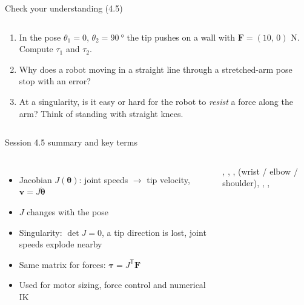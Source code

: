 \documentclass[aspectratio=169,10pt]{beamer}
\newcommand{\arm}[3]{%
  \draw[#3] (0,0) -- ++(#1:2.4) coordinate (E) -- ++(#1+#2:1.8) coordinate (T);
  \node[jnt] at (0,0) {}; \node[jnt] at (E) {}; \fill[mkOrange] (T) circle (1.6pt);}
\newcommand{\base}{\fill[pattern=north east lines,pattern color=mkGray] (-.35,-.25) rectangle (.35,-.08);
  \draw[mkGray,line width=.8pt] (-.35,-.08) -- (.35,-.08);}
\begin{document}
\begin{frame}[t]{Check your understanding (4.5)}
\begin{columns}[T,onlytextwidth]
\begin{keybox}
\begin{enumerate}\small
\item In the pose $\theta_1=0$, $\theta_2=\SI{90}{\degree}$ the tip pushes on a wall with $\bm F=(10,\,0)$ N. Compute $\tau_1$ and $\tau_2$.
\item Why does a robot moving in a straight line through a stretched-arm pose stop with an error?
\item At a singularity, is it easy or hard for the robot to \emph{resist} a force along the arm? Think of standing with straight knees.
\end{enumerate}
\end{keybox}
\centering
{}
\end{columns}
\end{frame}

\begin{frame}[t]{Session 4.5 summary and key terms}
\begin{columns}[T,onlytextwidth]
\begin{itemize}\small
\item Jacobian $J(\bm\theta)$: joint speeds $\rightarrow$ tip velocity, $\bm v=J\dot{\bm\theta}$
\item $J$ changes with the pose
\item Singularity: $\det J=0$, a tip direction is lost, joint speeds explode nearby
\item Same matrix for forces: $\bm\tau=J^\mathsf{T}\bm F$
\item Used for motor sizing, force control and numerical IK
\end{itemize}
\begin{defbox}
\small
{}, , ,  (wrist / elbow / shoulder), , , 
\end{defbox}
\end{columns}
\end{frame}
\end{document}
